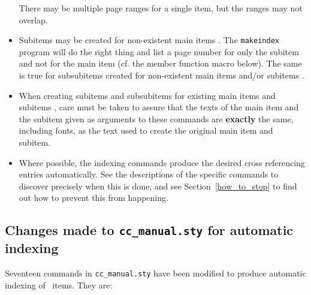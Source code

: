 \documentclass{article}
\makeatletter
\newcommand{\TTindex}[1]{\index{#1@{\tt #1}}}
\makeatother
\begin{document}
\begin{itemize}
         There may be multiple page ranges for a single item, but the
         ranges may not overlap.
   \item Subitems may be created for non-existent main items%
         .
         The {\tt makeindex} program will do the right thing and list a 
         page number for only the subitem and not for the main item 
         (cf. the member function macro below).  The same is true for 
         subsubitems created for non-existent main items and/or subitems%
         .
   \item When creating subitems and subsubitems for existing main items
         and subitems%
         , care 
         must be taken to assure that the texts of the main item and the 
         subitem given as arguments to these commands are {\bf exactly}
         the same, including fonts, as the text used to create 
         the original main item and subitem.  
   \item Where possible, the indexing commands produce the desired cross 
         referencing entries automatically.  See 
         the descriptions of the 
         specific commands to discover precisely when this is done, and
         see Section~\ref{how_to_stop} to find out how to prevent this
         from happening.
\end{itemize}

\subsection{Changes made to {\tt cc\_manual.sty} for automatic indexing}%
\label{auto_index}

Seventeen commands in \verb|cc_manual.sty|\TTindex{cc\_manual.sty} have been 
modified to produce automatic indexing of \CC\ items.  They are:
\end{document}
